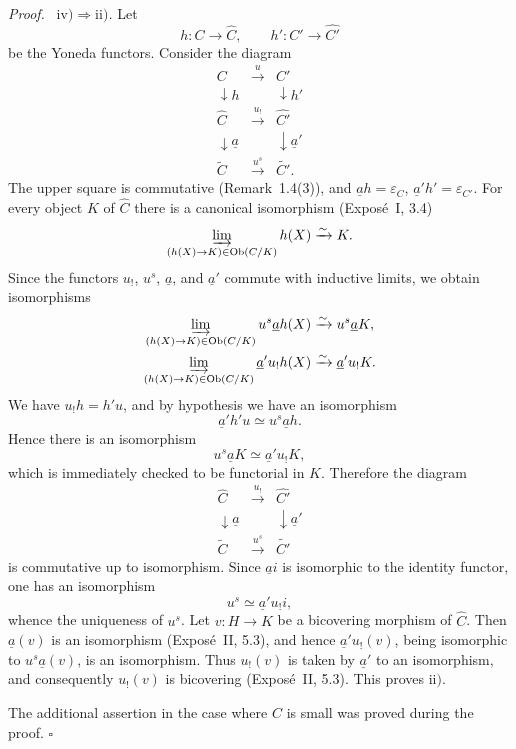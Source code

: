 \documentclass[11pt]{article}
\newcommand{\Ob}{\operatorname{Ob}}
\newcommand{\qedtext}{\hfill\(\square\)}
\newenvironment{prooftext}{\par\noindent\emph{Proof.}\ }{\par\medskip}
\begin{document}
\begin{prooftext}
\medskip\noindent
\emph{\(\mathrm{iv)}\Rightarrow\mathrm{ii)}\).} Let
\[
h:C\to\widehat C,
\qquad h':C'\to\widehat {C'}
\]
be the Yoneda functors. Consider the diagram
\[
\begin{array}{ccccc}
C&\xrightarrow{\ u\ }&C'\\
\downarrow{\scriptstyle h}&&\downarrow{\scriptstyle h'}\\
\widehat C&\xrightarrow{\ u_!\ }&\widehat {C'}\\
\downarrow{\scriptstyle\underline a}&&\downarrow{\scriptstyle\underline a'}\\
\widetilde C&\xrightarrow{\ u^s\ }&\widetilde {C'}.
\end{array}
\]
The upper square is commutative (Remark~1.4(3)), and \(\underline ah=\varepsilon_C\), \(\underline a'h'=\varepsilon_{C'}\). For every object \(K\) of \(\widehat C\) there is a canonical isomorphism (Expos\'e~I, 3.4)
\[
\varinjlim_{(h(X)\to K)\in\Ob(C/K)}h(X)\xrightarrow{\sim}K.
\]
Since the functors \(u_!\), \(u^s\), \(\underline a\), and \(\underline a'\) commute with inductive limits, we obtain isomorphisms
\begin{gather*}
\varinjlim_{(h(X)\to K)\in\Ob(C/K)}u^s\underline ah(X)
\xrightarrow{\sim}u^s\underline aK,\\
\varinjlim_{(h(X)\to K)\in\Ob(C/K)}\underline a'u_!h(X)
\xrightarrow{\sim}\underline a'u_!K.
\end{gather*}
We have \(u_!h=h'u\), and by hypothesis we have an isomorphism
\[
\underline a'h'u\simeq u^s\underline ah.
\]
Hence there is an isomorphism
\[
u^s\underline aK\simeq\underline a'u_!K,
\]
which is immediately checked to be functorial in \(K\). Therefore the diagram
\[
\begin{array}{ccc}
\widehat C&\xrightarrow{\ u_!\ }&\widehat {C'}\\
\downarrow{\scriptstyle\underline a}&&\downarrow{\scriptstyle\underline a'}\\
\widetilde C&\xrightarrow{\ u^s\ }&\widetilde {C'}
\end{array}
\]
is commutative up to isomorphism. Since \(\underline ai\) is isomorphic to the identity functor, one has an isomorphism
\[
u^s\simeq\underline a'u_!i,
\]
whence the uniqueness of \(u^s\). Let \(v:H\to K\) be a bicovering morphism of \(\widehat C\). Then \(\underline a(v)\) is an isomorphism (Expos\'e~II, 5.3), and hence \(\underline a'u_!(v)\), being isomorphic to \(u^s\underline a(v)\), is an isomorphism. Thus \(u_!(v)\) is taken by \(\underline a'\) to an isomorphism, and consequently \(u_!(v)\) is bicovering (Expos\'e~II, 5.3). This proves \(\mathrm{ii)}\).

The additional assertion in the case where \(C\) is small was proved during the proof. \qedtext
\end{prooftext}
\end{document}
